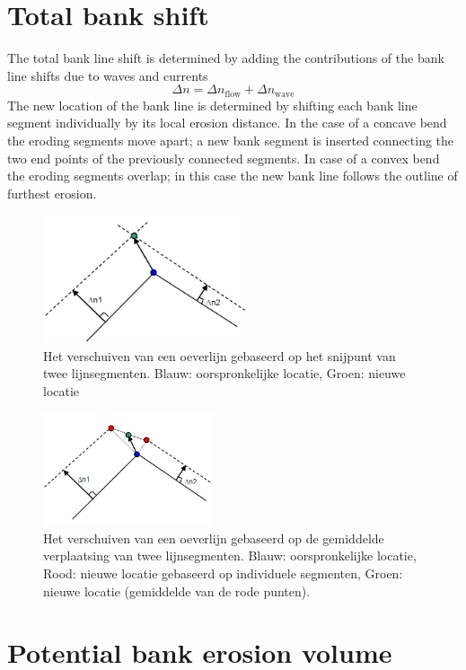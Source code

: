 \section{Total bank shift} \label{Sec4.3}

The total bank line shift is determined by adding the contributions of the bank line shifts due to waves and currents
%
\begin{equation}
\Delta n = \Delta n_\text{flow} + \Delta n_\text{wave}
\end{equation}
%
The new location of the bank line is determined by shifting each bank line segment individually by its local erosion distance.
In the case of a concave bend the eroding segments move apart; a new bank segment is inserted connecting the two end points of the previously connected segments.
In case of a convex bend the eroding segments overlap; in this case the new bank line follows the outline of furthest erosion.

\begin{figure}
\includegraphics[width=6cm]{figures/Fig4-3.png}
\caption{Het verschuiven van een oeverlijn gebaseerd op het snijpunt van twee lijnsegmenten.
Blauw: oorspronkelijke locatie, Groen: nieuwe locatie}
\label{Fig4.3}
\end{figure}

\begin{figure}
\includegraphics[width=5cm]{figures/Fig4-4.png}
\caption{Het verschuiven van een oeverlijn gebaseerd op de gemiddelde verplaatsing van twee lijnsegmenten.
Blauw: oorspronkelijke locatie, Rood: nieuwe locatie gebaseerd op individuele segmenten, Groen: nieuwe locatie (gemiddelde van de rode punten).}
\label{Fig4.4}
\end{figure}

\section{Potential bank erosion volume} \label{Sec4.4}

